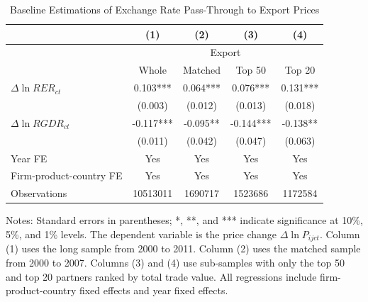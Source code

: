 \documentclass[12pt]{article}
\begin{document}
\setcounter{table}{0}

\renewcommand{\thetable}{A\arabic{table}}

\begin{table}[htbp]
	\centering
	\caption{Baseline Estimations of Exchange Rate Pass-Through to Export Prices}
	\begin{threeparttable}
		\begin{tabular}{lcccc}
			\toprule
			& (1)   & (2)   & (3)   & (4) \\
			\midrule
			& \multicolumn{4}{c}{Export} \\
			& Whole & Matched & Top 50 & Top 20 \\
			\midrule
			$\Delta \ln RER_{ct}$ & 0.103*** & 0.064*** & 0.076*** & 0.131*** \\
			& (0.003) & (0.012) & (0.013) & (0.018) \\
			$\Delta \ln RGDR_{ct}$ &  -0.117*** & -0.095** & -0.144*** & -0.138** \\
			& (0.011) & (0.042) & (0.047) & (0.063) \\
			Year FE  & Yes   & Yes   & Yes   & Yes \\
			Firm-product-country FE & Yes   & Yes   & Yes   & Yes \\
			Observations & 10513011 & 1690717 & 1523686 & 1172584 \\
			\bottomrule
		\end{tabular}
		\begin{tablenotes}
			\footnotesize
			\item[Notes:] Standard errors in parentheses; *, **, and *** indicate significance at 10\%, 5\%, and 1\% levels. The dependent variable is the price change $\Delta \ln P_{ijct}$. Column (1) uses the long sample from 2000 to 2011. Column (2) uses the matched sample from 2000 to 2007. Columns (3) and (4) use sub-samples with only the top 50 and top 20 partners ranked by total trade value. All regressions include firm-product-country fixed effects and year fixed effects. 
		\end{tablenotes}
	\end{threeparttable}
	\label{tab.baseline.exp}
\end{table}
\end{document}
